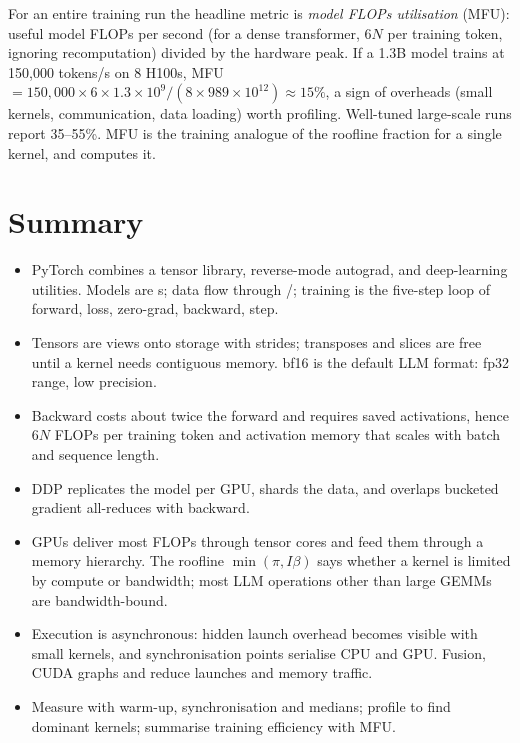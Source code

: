 \begin{systemslens}
For an entire training run the headline metric is \emph{model FLOPs utilisation} (MFU): useful model FLOPs
per second (for a dense transformer, $6N$ per training token, ignoring recomputation) divided by the hardware
peak. If a 1.3B model trains at 150{,}000 tokens/s on 8 H100s, MFU $=150{,}000\times6\times1.3\times10^9/(8\times989\times10^{12})
\approx 15\%$, a sign of overheads (small kernels, communication, data loading) worth profiling. Well-tuned
large-scale runs report 35--55\%. MFU is the training analogue of the roofline fraction for a single kernel,
and  computes it.
\end{systemslens}

\section{Summary}\label{sec:pytorch:summary}
\begin{itemize}
\item PyTorch combines a tensor library, reverse-mode autograd, and deep-learning utilities. Models are
  s; data flow through /; training is the five-step loop of forward,
  loss, zero-grad, backward, step.
\item Tensors are views onto storage with strides; transposes and slices are free until a kernel needs
  contiguous memory. bf16 is the default LLM format: fp32 range, low precision.
\item Backward costs about twice the forward and requires saved activations, hence $6N$ FLOPs per training
  token and activation memory that scales with batch and sequence length.
\item DDP replicates the model per GPU, shards the data, and overlaps bucketed gradient all-reduces with
  backward.
\item GPUs deliver most FLOPs through tensor cores and feed them through a memory hierarchy. The roofline
  $\min(\pi, I\beta)$ says whether a kernel is limited by compute or bandwidth; most LLM operations other than
  large GEMMs are bandwidth-bound.
\item Execution is asynchronous: hidden launch overhead becomes visible with small kernels, and
  synchronisation points serialise CPU and GPU. Fusion, CUDA graphs and  reduce launches
  and memory traffic.
\item Measure with warm-up, synchronisation and medians; profile to find dominant kernels; summarise
  training efficiency with MFU.
\end{itemize}

